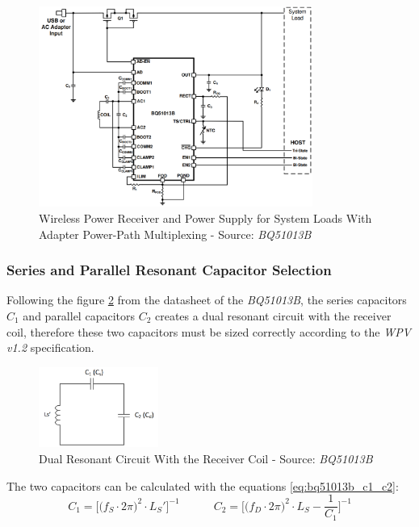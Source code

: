 \documentclass[report.tex]{subfiles}
\begin{document}
\begin{figure}[H]
	\centering
	\includegraphics[width=0.8\textwidth]{Include/Figure/comp/bq51013b_impl_schem.png}
	\caption{Wireless Power Receiver and Power Supply for System Loads With Adapter Power-Path Multiplexing - Source: \textit{BQ51013B}\cite{BQ51013B}}
	\label{fig:bq51013b_impl_schem}
\end{figure}

\subsubsection{Series and Parallel Resonant Capacitor Selection}

Following the figure \ref{fig:bq51013b_res_cap_sel} from the datasheet of the \textit{BQ51013B}\cite{BQ51013B}, the series capacitors $C_1$ and parallel capacitors $C_2$ creates a dual resonant circuit with the receiver coil, therefore these two capacitors must be sized correctly according to the \textit{WPV v1.2} specification.

\begin{figure}[H]
	\centering
	\includegraphics[width=0.35\textwidth]{Include/Figure/comp/bq51013b_res_cap_sel.png}
	\caption{Dual Resonant Circuit With the Receiver Coil - Source: \textit{BQ51013B}\cite{BQ51013B}}
	\label{fig:bq51013b_res_cap_sel}
\end{figure}

The two capacitors can be calculated with the equations \ref{eq:bq51013b_c1_c2}:
\begin{equation}
\label{eq:bq51013b_c1_c2}
\boxed{C_1 = \bigg[ \big(f_S \cdot 2 \pi\big)^2 \cdot L_S' \bigg]^{-1}} \quad \quad \quad
\boxed{C_2 = \bigg[ \big(f_D \cdot 2 \pi\big)^2 \cdot L_S - \dfrac{1}{C_1} \bigg]^{-1}} 
\end{equation}
\end{document}

